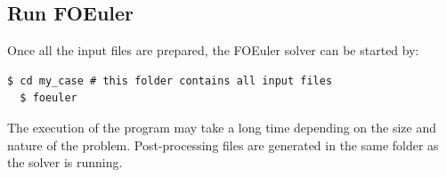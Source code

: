 \documentclass[]{article}
\begin{document}
\subsection{Run FOEuler}

Once all the input files are prepared, the FOEuler solver can be started by:
\begin{lstlisting}[backgroundcolor=\color{lightgray}]
  $ cd my_case # this folder contains all input files
  $ foeuler
\end{lstlisting}
The execution of the program may take a long time depending on the size and nature of the problem.
Post-processing files are generated in the same folder as the solver is running.

\end{document}
